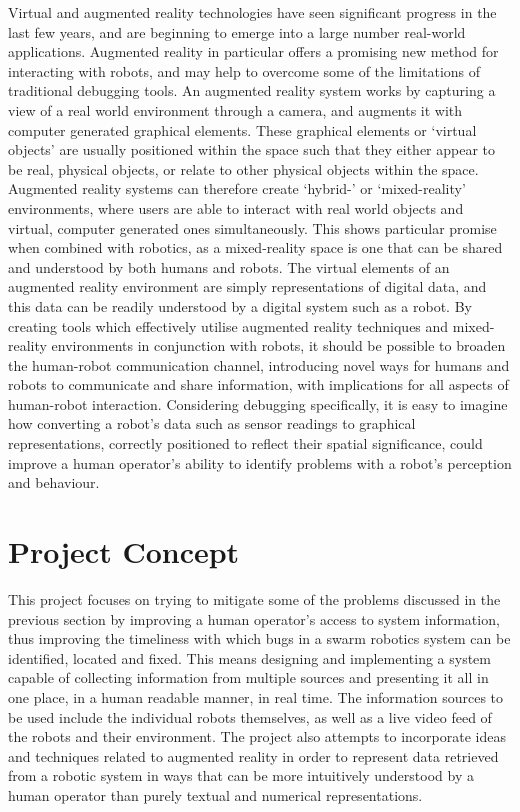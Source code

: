 Virtual and augmented reality technologies have seen significant progress in the last few years, and are beginning to emerge into a large number real-world applications. Augmented reality in particular offers a promising new method for interacting with robots, and may help to overcome some of the limitations of traditional debugging tools. An augmented reality system works by capturing a view of a real world environment through a camera, and augments it with computer generated graphical elements. These graphical elements or `virtual objects' are usually positioned within the space such that they either appear to be real, physical objects, or relate to other physical objects within the space. Augmented reality systems can therefore create `hybrid-' or `mixed-reality' environments, where users are able to interact with real world objects and virtual, computer generated ones simultaneously. This shows particular promise when combined with robotics, as a mixed-reality space is one that can be shared and understood by both humans and robots. The virtual elements of an augmented reality environment are simply representations of digital data, and this data can be readily understood by a digital system such as a robot. By creating tools which effectively utilise augmented reality techniques and mixed-reality environments in conjunction with robots, it should be possible to broaden the human-robot communication channel, introducing novel ways for humans and robots to communicate and share information, with implications for all aspects of human-robot interaction. Considering debugging specifically, it is easy to imagine how converting a robot's data such as sensor readings to graphical representations, correctly positioned to reflect their spatial significance, could improve a human operator's ability to identify problems with a robot's perception and behaviour.


\section{Project Concept} \label{ProjectConcept}
This project focuses on trying to mitigate some of the problems discussed in the previous section by improving a human operator's access to system information, thus improving the timeliness with which bugs in a swarm robotics system can be identified, located and fixed. This means designing and implementing a system capable of collecting information from multiple sources and presenting it all in one place, in a human readable manner, in real time. The information sources to be used include the individual robots themselves, as well as a live video feed of the robots and their environment. The project also attempts to incorporate ideas and techniques related to augmented reality in order to represent data retrieved from a robotic system in ways that can be more intuitively understood by a human operator than purely textual and numerical representations.

